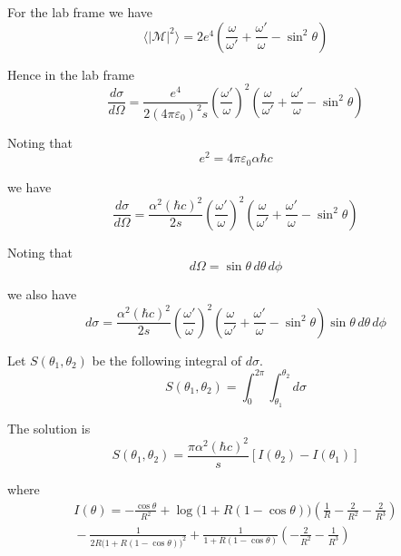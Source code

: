 For the lab frame we have
\begin{equation*}
\langle|\mathcal{M}|^2\rangle
=2e^4\left(
\frac{\omega}{\omega'}+\frac{\omega'}{\omega}-\sin^2\theta
\right)
\end{equation*}

Hence in the lab frame
\begin{equation*}
\frac{d\sigma}{d\Omega}
=\frac{e^4}{2(4\pi\varepsilon_0)^2s}
\left(\frac{\omega'}{\omega}\right)^2
\left(
\frac{\omega}{\omega'}+\frac{\omega'}{\omega}-\sin^2\theta
\right)
\end{equation*}

Noting that
\begin{equation*}
e^2=4\pi\varepsilon_0\alpha\hbar c
\end{equation*}

we have
\begin{equation*}
\frac{d\sigma}{d\Omega}
=\frac{\alpha^2(\hbar c)^2}{2s}
\left(\frac{\omega'}{\omega}\right)^2
\left(
\frac{\omega}{\omega'}+\frac{\omega'}{\omega}-\sin^2\theta
\right)
\end{equation*}

Noting that
\begin{equation*}
d\Omega=\sin\theta\,d\theta\,d\phi
\end{equation*}

we also have
\begin{equation*}
d\sigma
=\frac{\alpha^2(\hbar c)^2}{2s}
\left(\frac{\omega'}{\omega}\right)^2
\left(
\frac{\omega}{\omega'}+\frac{\omega'}{\omega}-\sin^2\theta
\right)
\sin\theta\,d\theta\,d\phi
\end{equation*}

Let $S(\theta_1,\theta_2)$ be the following integral of $d\sigma$.
\begin{equation*}
S(\theta_1,\theta_2)=\int_0^{2\pi}\int_{\theta_1}^{\theta_2}d\sigma
\end{equation*}

The solution is
\begin{equation*}
S(\theta_1,\theta_2)=\frac{\pi\alpha^2(\hbar c)^2}{s}[I(\theta_2)-I(\theta_1)]
\end{equation*}

where
\begin{multline*}
I(\theta)=-\frac{\cos\theta}{R^2}
+\log\bigl(1+R(1-\cos\theta)\bigr)\left(\frac{1}{R}-\frac{2}{R^2}-\frac{2}{R^3}\right)
\\
{}-\frac{1}{2R\bigl(1+R(1-\cos\theta)\bigr)^2}
+\frac{1}{1+R(1-\cos\theta)}\left(-\frac{2}{R^2}-\frac{1}{R^3}\right)
\end{multline*}

